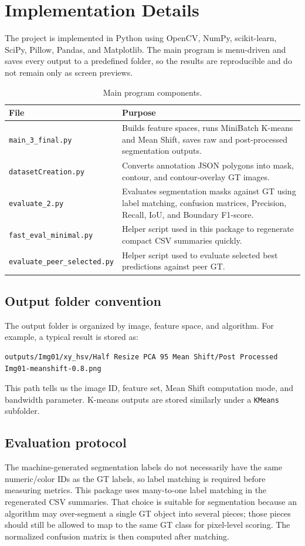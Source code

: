 
\section{Implementation Details}
The project is implemented in Python using OpenCV, NumPy, scikit-learn, SciPy, Pillow, Pandas, and Matplotlib. The main program is menu-driven and saves every output to a predefined folder, so the results are reproducible and do not remain only as screen previews.

\begin{table}[H]
\centering
\caption{Main program components.}
\begin{tabular}{@{}p{}p{}@{}}
\toprule
File & Purpose \\
\midrule
\texttt{main\_3\_final.py} & Builds feature spaces, runs MiniBatch K-means and Mean Shift, saves raw and post-processed segmentation outputs. \\
\texttt{datasetCreation.py} & Converts annotation JSON polygons into mask, contour, and contour-overlay GT images. \\
\texttt{evaluate\_2.py} & Evaluates segmentation masks against GT using label matching, confusion matrices, Precision, Recall, IoU, and Boundary F1-score. \\
\texttt{fast\_eval\_minimal.py} & Helper script used in this package to regenerate compact CSV summaries quickly. \\
\texttt{evaluate\_peer\_selected.py} & Helper script used to evaluate selected best predictions against peer GT. \\
\bottomrule
\end{tabular}
\label{tab:program-components}
\end{table}

\subsection{Output folder convention}
The output folder is organized by image, feature space, and algorithm. For example, a typical result is stored as:
\begin{lstlisting}
outputs/Img01/xy_hsv/Half Resize PCA 95 Mean Shift/Post Processed Img01-meanshift-0.8.png
\end{lstlisting}
This path tells us the image ID, feature set, Mean Shift computation mode, and bandwidth parameter. K-means outputs are stored similarly under a \texttt{KMeans} subfolder.

\subsection{Evaluation protocol}
The machine-generated segmentation labels do not necessarily have the same numeric/color IDs as the GT labels, so label matching is required before measuring metrics. This package uses many-to-one label matching in the regenerated CSV summaries. That choice is suitable for segmentation because an algorithm may over-segment a single GT object into several pieces; those pieces should still be allowed to map to the same GT class for pixel-level scoring. The normalized confusion matrix is then computed after matching.

